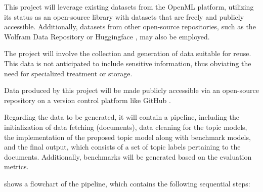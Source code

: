 \documentclass{article}
\begin{document}

This project will leverage existing datasets from the OpenML platform, utilizing its status as an open-source library with datasets that are freely and publicly accessible. Additionally, datasets from other open-source repositories, such as the Wolfram Data Repository \cite{noauthor_wolfram_nodate} or Huggingface \cite{noauthor_hugging_2024}, may also be employed.

The project will involve the collection and generation of data suitable for reuse. This data is not anticipated to include sensitive information, thus obviating the need for specialized treatment or storage.

Data produced by this project will be made publicly accessible via an open-source repository on a version control platform like GitHub \cite{noauthor_github_nodate}.

Regarding the data to be generated, it will contain a pipeline, including the initialization of data fetching (documents), data cleaning for the topic models, the implementation of the proposed topic model along with benchmark models, and the final output, which consists of a set of topic labels pertaining to the documents. Additionally, benchmarks will be generated based on the evaluation metrics.

 shows a flowchart of the pipeline, which contains the following sequential steps:
\end{document}
